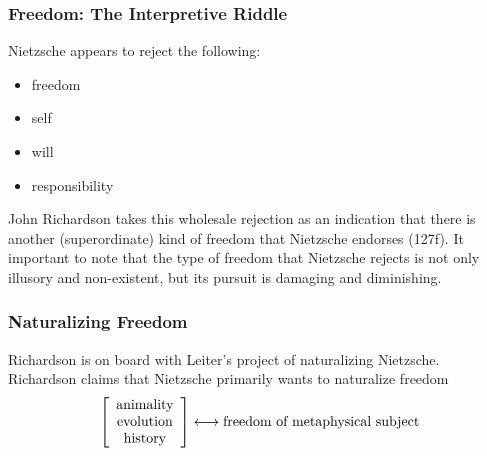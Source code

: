 \documentclass[xcolor=dvipsnames]{beamer}
\begin{document}

\begin{frame}
  \frametitle{Freedom: The Interpretive Riddle}
  Nietzsche appears to reject the following:
  \begin{itemize}
  \item freedom
  \item self
  \item will
  \item responsibility
  \end{itemize}
  John Richardson takes this wholesale rejection as an indication that
  there is another (superordinate) kind of freedom that Nietzsche
  endorses (127f). It important to note that the type of freedom that
  Nietzsche rejects is not only illusory and non-existent, but its
  pursuit is damaging and diminishing.
\end{frame}

\begin{frame}
  \frametitle{Naturalizing Freedom}
  Richardson is on board with Leiter's project of naturalizing
  Nietzsche. Richardson claims that Nietzsche primarily wants to
  naturalize freedom
  \begin{equation}
    \label{eq:uatheezu}
    \left[
      \begin{array}{c}
        \mbox{animality} \\
        \mbox{evolution} \\
        \mbox{history}
      \end{array}\right]
\longleftrightarrow\mbox{freedom of metaphysical subject}\notag
\end{equation}
\end{frame}
\end{document}
